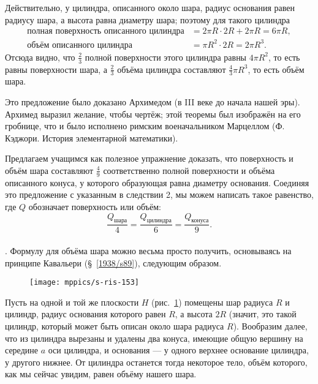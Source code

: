 Действительно, у цилиндра, описанного около шара, радиус основания равен радиусу шара, а высота равна диаметру шара;
поэтому для такого цилиндра
\begin{align*}
\text{полная поверхность описанного цилиндра} &= 2\pi R \cdot 2R + 2\pi R = 6\pi R,
\\
\text{объём описанного цилиндра} &= \pi R^2\cdot 2R = 2\pi R^3.
\end{align*}
Отсюда видно, что $\tfrac23$ полной поверхности этого цилиндра равны $4\pi R^2$, то есть равны поверхности шара, а $\tfrac23$ объёма цилиндра составляют $\tfrac43\pi R^3$, то есть объём шара.

Это предложение было доказано Архимедом (в III веке до начала нашей эры).
Архимед выразил желание, чтобы чертёж;
этой теоремы был изображён на его гробнице, что и было исполнено римским военачальником Марцеллом (Ф. Кэджори. История элементарной математики).

Предлагаем учащимся как полезное упражнение доказать, что поверхность и объём шара составляют $\tfrac49$ соответственно полной поверхности и объёма описанного конуса, у которого образующая равна диаметру основания.
Соединяя это предложение с указанным в следствии 2, мы можем написать такое равенство, где $Q$ обозначает поверхность или объём:
\[\frac{Q_{\text{шара}}}4
=\frac{Q_{\text{цилиндра}}}6
=\frac{Q_{\text{конуса}}}9.
\]

\paragraph{}\label{1938/s147}
.
Формулу для объёма шара можно весьма просто получить, основываясь на принципе Кавальери (§~\ref{1938/s89}), следующим образом.

\begin{figure}[h!]
\vskip-0mm
\centering
\texttt{[image: mppics/s-ris-153]}
\caption{}\label{1938/s-ris-153}
\vskip-0mm
\end{figure}

Пусть на одной и той же плоскости $H$ (рис.~\ref{1938/s-ris-153}) помещены шар радиуса $R$ и цилиндр, радиус основания которого равен $R$, а высота $2R$ (значит, это такой цилиндр, который может быть описан около шара радиуса $R$).
Вообразим далее, что из цилиндра вырезаны и удалены два конуса, имеющие общую вершину на середине $a$ оси цилиндра, и основания — у одного верхнее основание цилиндра, у другого нижнее.
От цилиндра останется тогда некоторое тело, объём которого, как мы сейчас увидим, равен объёму нашего шара.

